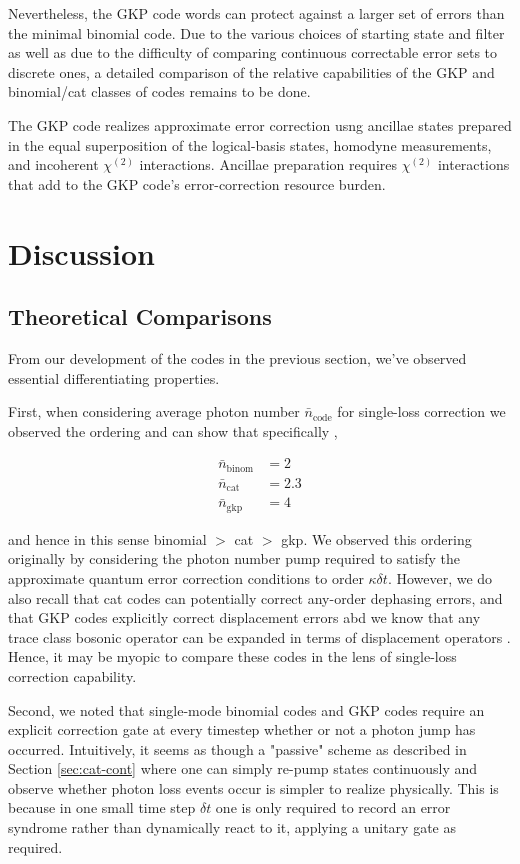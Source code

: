 \documentclass[12]{amsart}
\newcommand\0{\mathbf{0}}
\newcommand\<{\langle}
\renewcommand\>{\rangle}
\begin{document}
Nevertheless, the GKP code words can protect against a larger set of errors than the minimal binomial code. Due to the various choices of starting state and filter as well as due to the difficulty of comparing continuous correctable error sets to discrete ones, a detailed comparison of the relative capabilities of the GKP and binomial/cat classes of codes remains to be done.

The GKP code realizes approximate error correction usng ancillae states prepared in the equal superposition of the logical-basis states, homodyne measurements, and incoherent $\chi^{(2)}$ interactions. Ancillae preparation requires $\chi^{(2)}$ interactions that add to the GKP code’s error-correction resource burden\cite{niu2018hardware}.

\section{Discussion}

\subsection{Theoretical Comparisons}

From our development of the codes in the previous section, we've observed essential differentiating properties.

First, when considering average photon number $\bar{n}_{\text{code}}$ for single-loss correction we observed the ordering and can show that specifically \cite{michael2016new},

\begin{align*}
	\bar{n}_{\text{binom}} &= 2\\
	\bar{n}_{\text{cat}} &= 2.3\\
	\bar{n}_{\text{gkp}} &= 4
\end{align*}

and hence in this sense binomial $>$ cat $>$ gkp. We observed this ordering originally by considering the photon number pump required to satisfy the approximate quantum error correction conditions to order $\kappa \delta t$. However, we do also recall that cat codes can potentially correct any-order dephasing errors, and that GKP codes explicitly correct displacement errors abd we know that any trace class bosonic operator can be expanded in terms of displacement operators \cite{albert2017performance}. Hence, it may be myopic to compare these codes in the lens of single-loss correction capability.

Second, we noted that single-mode binomial codes and GKP codes require an explicit correction gate at every timestep whether or not a photon jump has occurred. Intuitively, it seems as though a "passive" scheme as described in Section \ref{sec:cat-cont} where one can simply re-pump states continuously and observe whether photon loss events occur is simpler to realize physically. This is because in one small time step $\delta t$ one is only required to record an error syndrome rather than dynamically react to it, applying a unitary gate as required.
\end{document}
